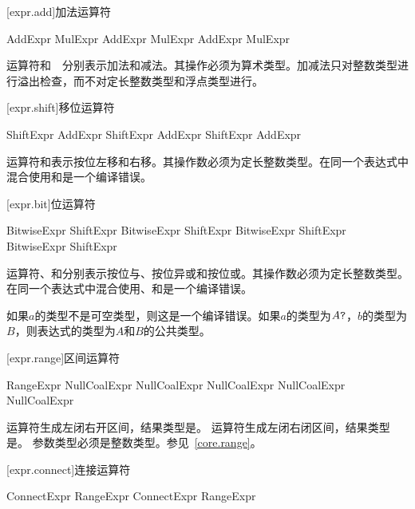 [expr.add]{加法运算符}

\begin{bnf}{AddExpr}
    MulExpr \br
    AddExpr \terminal{+} MulExpr \br
    AddExpr \terminal{-} MulExpr
\end{bnf}

\pnum
运算符\tcode{+}和\ \tcode{-}\ 分别表示加法和减法。其操作必须为算术类型。加减法只对整数类型进行溢出检查，而不对定长整数类型和浮点类型进行。

[expr.shift]{移位运算符}

\begin{bnf}{ShiftExpr}
    AddExpr \br
    ShiftExpr  AddExpr \br
    ShiftExpr  AddExpr
\end{bnf}

\pnum
运算符和表示按位左移和右移。其操作数必须为定长整数类型。在同一个表达式中混合使用和是一个编译错误。

[expr.bit]{位运算符}

\begin{bnf}{BitwiseExpr}
    ShiftExpr \br
    BitwiseExpr  ShiftExpr \br
    BitwiseExpr  ShiftExpr \br
    BitwiseExpr  ShiftExpr
\end{bnf}

\pnum
运算符、和分别表示按位与、按位异或和按位或。其操作数必须为定长整数类型。在同一个表达式中混合使用、和是一个编译错误。

\pnum
如果$a$的类型不是可空类型，则这是一个编译错误。如果$a$的类型为$A\texttt{?}$，$b$的类型为$B$，则表达式的类型为$A$和$B$的公共类型。

[expr.range]{区间运算符}

\begin{bnf}{RangeExpr}
    NullCoalExpr \br
    NullCoalExpr  NullCoalExpr \br
    NullCoalExpr  NullCoalExpr
\end{bnf}

\pnum
运算符生成左闭右开区间，结果类型是。
运算符生成左闭右闭区间，结果类型是。
参数类型必须是整数类型。参见~\ref{core.range}。

[expr.connect]{连接运算符}

\begin{bnf}{ConnectExpr}
    RangeExpr \br
    ConnectExpr \terminal{\~} RangeExpr
\end{bnf}

